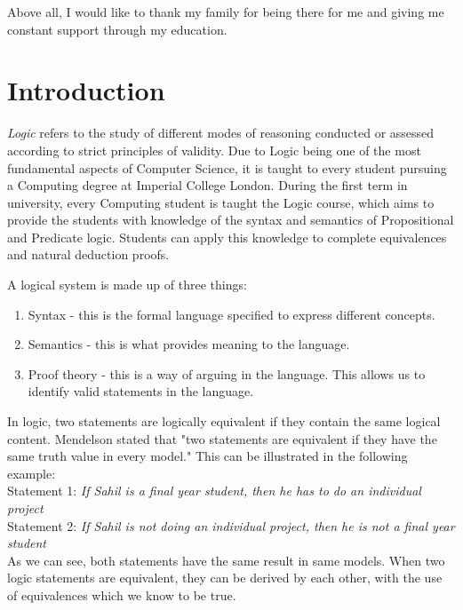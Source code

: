 \documentclass{report}
\begin{document}
Above all, I would like to thank my family for being there for me and giving
me constant support through my education.


\tableofcontents


\chapter{Introduction}

\emph{Logic} refers to the study of different modes of reasoning conducted or 
assessed according to strict principles of validity. Due to Logic being one of 
the most fundamental aspects of Computer Science, it is taught to every student
pursuing a Computing degree at Imperial College London. During the first term 
in university, every Computing student is taught the Logic course, which aims to
provide the students with knowledge of the syntax and semantics of Propositional 
and Predicate logic. Students can apply this knowledge to complete equivalences
and natural deduction proofs.

A logical system is made up of three things:

\begin{enumerate}
  \item Syntax - this is the formal language specified to express different
         concepts.
  \item Semantics - this is what provides meaning to the language.
  \item Proof theory - this is a way of arguing in the language. This allows us
         to identify valid statements in the language.
\end{enumerate}

In logic, two statements are logically equivalent if they contain the same
logical content. Mendelson stated that "two statements are equivalent if they
have the same truth value in every model." This can be illustrated in the 
following example: \\ \bigskip 
Statement 1: \emph{If Sahil is a final year student, 
then he has to do an individual project} \\ \bigskip 
Statement 2: \emph{If Sahil is not 
doing an individual project, then he is not a final year student} \\ \bigskip 
As we can see, both statements have the same result in same models. When two logic 
statements are equivalent, they can be derived by each other, with the use of 
equivalences which we know to be true.
\end{document}
